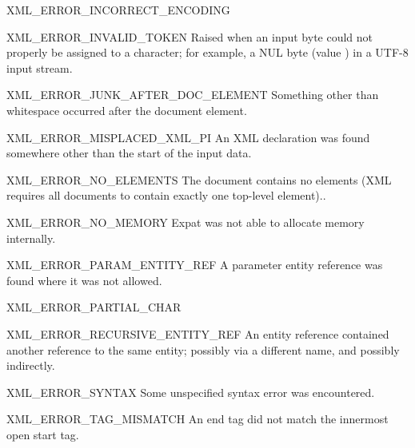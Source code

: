 \begin{datadescni}{XML_ERROR_INCORRECT_ENCODING}
\end{datadescni}

\begin{datadescni}{XML_ERROR_INVALID_TOKEN}
Raised when an input byte could not properly be assigned to a
character; for example, a NUL byte (value ) in a UTF-8 input
stream.
\end{datadescni}

\begin{datadescni}{XML_ERROR_JUNK_AFTER_DOC_ELEMENT}
Something other than whitespace occurred after the document element.
\end{datadescni}

\begin{datadescni}{XML_ERROR_MISPLACED_XML_PI}
An XML declaration was found somewhere other than the start of the
input data.
\end{datadescni}

\begin{datadescni}{XML_ERROR_NO_ELEMENTS}
The document contains no elements (XML requires all documents to
contain exactly one top-level element)..
\end{datadescni}

\begin{datadescni}{XML_ERROR_NO_MEMORY}
Expat was not able to allocate memory internally.
\end{datadescni}

\begin{datadescni}{XML_ERROR_PARAM_ENTITY_REF}
A parameter entity reference was found where it was not allowed.
\end{datadescni}

\begin{datadescni}{XML_ERROR_PARTIAL_CHAR}

\end{datadescni}

\begin{datadescni}{XML_ERROR_RECURSIVE_ENTITY_REF}
An entity reference contained another reference to the same entity;
possibly via a different name, and possibly indirectly.
\end{datadescni}

\begin{datadescni}{XML_ERROR_SYNTAX}
Some unspecified syntax error was encountered.
\end{datadescni}

\begin{datadescni}{XML_ERROR_TAG_MISMATCH}
An end tag did not match the innermost open start tag.
\end{datadescni}

